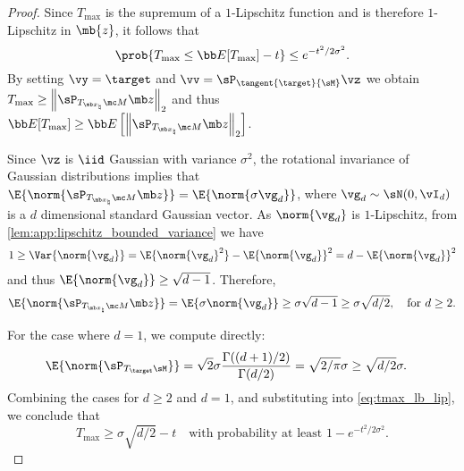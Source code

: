 \begin{proof}
Since $T_{\max}$ is the supremum of a $1$-Lipschitz function and is therefore $1$-Lipschitz in $\mb{z}$, it follows that
\begin{equation}\label{eq:tmax_lb_lip}
    \prob{T_{\max} \leq \bb E[T_{\max}] - t} \le e^{-t^2/ 2 \sigma^2}.
\end{equation}
By setting $\vy = \target$ and $\vv = \sP_{\tangent{\target}{\sM}}\vz$ we obtain \(
    T_{\max} \geq \left\| \sP_{T_{\mb x_\natural} \mc M} \mb z\right\|_2 \) and thus \(\bb E[T_{\max}] \geq \bb E\left[\left\| \sP_{T_{\mb x_\natural} \mc M} \mb z\right\|_2\right]\). 

Since $\vz$ is $\iid$ Gaussian with variance $\sigma^2$, the rotational invariance of Gaussian distributions implies that $\E{\norm{\sP_{T_{\mb x_\natural} \mc M} \mb z}} = \E{\norm{\sigma \vg_d}}$, where $\vg_d \sim \sN(0, \vI_d)$ is a $d$ dimensional standard Gaussian vector. 
As $\norm{\vg_d}$ is $1$-Lipschitz, from \cref{lem:app:lipschitz_bounded_variance} we have
\begin{align}
    1 \ge \Var{\norm{\vg_d}} = \E{\norm{\vg_d}^2} - \E{\norm{\vg_d}}^2 = d - \E{\norm{\vg_d}}^2
\end{align}
and thus $\E{\norm{\vg_d}} \ge \sqrt{d - 1}$. 
Therefore, 
\begin{align}
    \E{\norm{\sP_{T_{\mb x_\natural} \mc M} \mb z}} = \E{\sigma \norm{\vg_d}} \ge \sigma \sqrt{d - 1} \ge \sigma \sqrt{d/2} , \quad \text{for } d \geq 2. 
\end{align}

For the case where $d = 1$, we compute directly:
\begin{align}
    \E{\norm{\sP_{T_{\target} \sM}}} &= \sqrt{2} \sigma \frac{\Gamma((d+1)/2)}{\Gamma(d/2)} = \sqrt{2/\pi} \sigma \ge \sqrt{d/2} \sigma. 
\end{align}
Combining the cases for $d \geq 2$ and $d = 1$, and substituting into \cref{eq:tmax_lb_lip}, we conclude that
\begin{equation}
        T_{\max} \geq \sigma \sqrt{d / 2} - t \quad \text{with probability at least } 1 - e^{-t^2 / 2\sigma^2}.
    \end{equation}
\end{proof}

